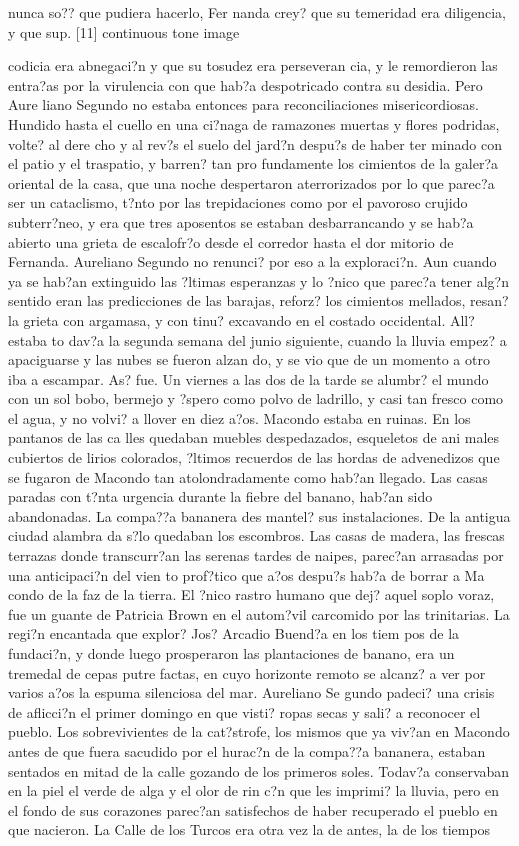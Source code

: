 nunca so?? que pudiera hacerlo, Fer nanda crey? que su temeridad era diligencia, y que sup. [11]
continuous tone image

 codicia era abnegaci?n y que su tosudez era perseveran cia, y le remordieron las entra?as por la virulencia con que hab?a despotricado contra su desidia. Pero Aure liano Segundo no estaba entonces para reconciliaciones misericordiosas. Hundido hasta el cuello en una ci?naga de ramazones muertas y flores podridas, volte? al dere cho y al rev?s el suelo del jard?n despu?s de haber ter minado con el patio y el traspatio, y barren? tan pro fundamente los cimientos de la galer?a oriental de la casa, que una noche despertaron aterrorizados por lo que parec?a ser un cataclismo, t?nto por las trepidaciones como por el pavoroso crujido subterr?neo, y era que tres aposentos se estaban desbarrancando y se hab?a abierto una grieta de escalofr?o desde el corredor hasta el dor mitorio de Fernanda. Aureliano Segundo no renunci? por eso a la exploraci?n. Aun cuando ya se hab?an extinguido las ?ltimas esperanzas y lo ?nico que parec?a tener alg?n sentido eran las predicciones de las barajas, reforz? los cimientos mellados, resan? la grieta con argamasa, y con tinu? excavando en el costado occidental. All? estaba to dav?a la segunda semana del junio siguiente, cuando la lluvia empez? a apaciguarse y las nubes se fueron alzan do, y se vio que de un momento a otro iba a escampar. As? fue. Un viernes a las dos de la tarde se alumbr? el mundo con un sol bobo, bermejo y ?spero como polvo de ladrillo, y casi tan fresco como el agua, y no volvi? a llover en diez a?os. Macondo estaba en ruinas. En los pantanos de las ca lles quedaban muebles despedazados, esqueletos de ani males cubiertos de lirios colorados, ?ltimos recuerdos de las hordas de advenedizos que se fugaron de Macondo tan atolondradamente como hab?an llegado. Las casas paradas con t?nta urgencia durante la fiebre del banano, hab?an sido abandonadas. La compa??a bananera des mantel? sus instalaciones. De la antigua ciudad alambra da s?lo quedaban los escombros. Las casas de madera, las frescas terrazas donde transcurr?an las serenas tardes de naipes, parec?an arrasadas por una anticipaci?n del vien to prof?tico que a?os despu?s hab?a de borrar a Ma condo de la faz de la tierra. El ?nico rastro humano que dej? aquel soplo voraz, fue un guante de Patricia Brown en el autom?vil carcomido por las trinitarias. La regi?n encantada que explor? Jos? Arcadio Buend?a en los tiem pos de la fundaci?n, y donde luego prosperaron las plantaciones de banano, era un tremedal de cepas putre factas, en cuyo horizonte remoto se alcanz? a ver por varios a?os la espuma silenciosa del mar. Aureliano Se gundo padeci? una crisis de aflicci?n el primer domingo en que visti? ropas secas y sali? a reconocer el pueblo. Los sobrevivientes de la cat?strofe, los mismos que ya viv?an en Macondo antes de que fuera sacudido por el hurac?n de la compa??a bananera, estaban sentados en mitad de la calle gozando de los primeros soles. Todav?a conservaban en la piel el verde de alga y el olor de rin c?n que les imprimi? la lluvia, pero en el fondo de sus corazones parec?an satisfechos de haber recuperado el pueblo en que nacieron. La Calle de los Turcos era otra vez la de antes, la de los tiempos 